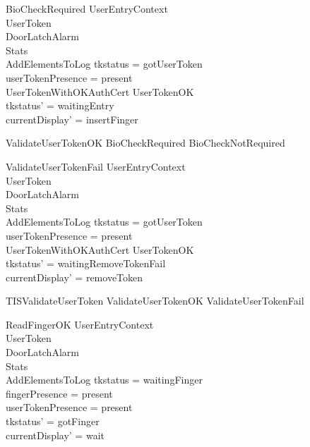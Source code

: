 \begin{schema}{BioCheckRequired}
  UserEntryContext\\
  \Xi UserToken\\
  \Xi DoorLatchAlarm\\
  \Xi Stats\\
  AddElementsToLog
\where
  tkstatus = gotUserToken\\
  userTokenPresence = present\\
  \lnot  UserTokenWithOKAuthCert \land  UserTokenOK\\
  tkstatus' = waitingEntry\\
  currentDisplay' = insertFinger
\end{schema}

\begin{zed}
ValidateUserTokenOK  BioCheckRequired \lor  BioCheckNotRequired
\end{zed}

\begin{schema}{ValidateUserTokenFail}
  UserEntryContext\\
  \Xi UserToken\\
  \Xi DoorLatchAlarm\\
  \Xi Stats\\
  AddElementsToLog
\where
  tkstatus = gotUserToken\\
  userTokenPresence = present\\
  \lnot  UserTokenWithOKAuthCert \land  \lnot  UserTokenOK\\
  tkstatus' = waitingRemoveTokenFail\\
  currentDisplay' = removeToken
\end{schema}

\begin{zed}
TISValidateUserToken  ValidateUserTokenOK \lor  ValidateUserTokenFail \lor  [UserTokenTorn | tkstatus = gotUserToken]
\end{zed}

\begin{schema}{ReadFingerOK}
  UserEntryContext\\
  \Xi UserToken\\
  \Xi DoorLatchAlarm\\
  \Xi Stats\\
  AddElementsToLog
\where
  tkstatus = waitingFinger\\
  fingerPresence = present\\
  userTokenPresence = present\\
  tkstatus' = gotFinger\\
  currentDisplay' = wait
\end{schema}

